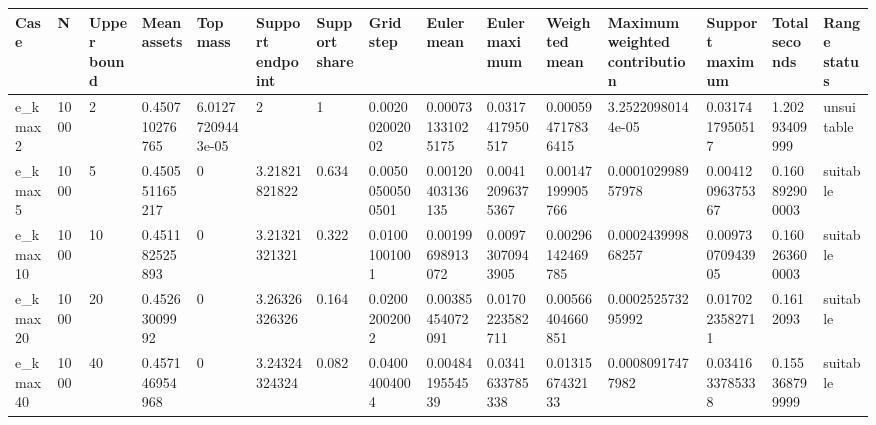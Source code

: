 \begin{tabular}{lllllllllllllll}
\hline
Case & N & Upper bound & Mean assets & Top mass & Support endpoint & Support share & Grid step & Euler mean & Euler maximum & Weighted mean & Maximum weighted contribution & Support maximum & Total seconds & Range status \\
\hline
e\_kmax2 & 1000 & 2 & 0.450710276765 & 6.01277209443e-05 & 2 & 1 & 0.002002002002 & 0.000731331025175 & 0.0317417950517 & 0.000594717836415 & 3.25220980144e-05 & 0.0317417950517 & 1.20293409999 & unsuitable \\
e\_kmax5 & 1000 & 5 & 0.450551165217 & 0 & 3.21821821822 & 0.634 & 0.00500500500501 & 0.00120403136135 & 0.00412096375367 & 0.00147199905766 & 0.000102998957978 & 0.00412096375367 & 0.160892900003 & suitable \\
e\_kmax10 & 1000 & 10 & 0.451182525893 & 0 & 3.21321321321 & 0.322 & 0.01001001001 & 0.00199698913072 & 0.00973070943905 & 0.00296142469785 & 0.000243999868257 & 0.00973070943905 & 0.160263600003 & suitable \\
e\_kmax20 & 1000 & 20 & 0.45263009992 & 0 & 3.26326326326 & 0.164 & 0.02002002002 & 0.00385454072091 & 0.0170223582711 & 0.00566404660851 & 0.000252573295992 & 0.0170223582711 & 0.1612093 & suitable \\
e\_kmax40 & 1000 & 40 & 0.457146954968 & 0 & 3.24324324324 & 0.082 & 0.04004004004 & 0.0048419554539 & 0.0341633785338 & 0.0131567432133 & 0.00080917477982 & 0.0341633785338 & 0.155368799999 & suitable \\
\hline
\end{tabular}
